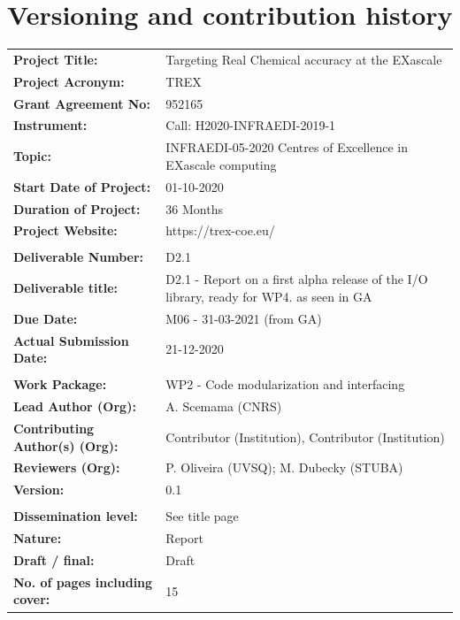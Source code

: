 \pagestyle{empty}

\section*{Versioning and contribution history}

\begin{flushleft}
  \begin{tabular}{ll}
    \textbf{Project Title:}    &   Targeting Real Chemical accuracy at the EXascale \\
    \textbf{Project Acronym:} & TREX \\
    \textbf{Grant Agreement No:} & 952165 \\
    \textbf{Instrument:} & Call: H2020-INFRAEDI-2019-1 \\
    \textbf{Topic:} & INFRAEDI-05-2020 Centres of Excellence in EXascale computing \\
    \textbf{Start Date of Project:} & 01-10-2020 \\
    \textbf{Duration of Project:} & 36 Months \\
    \textbf{Project Website:} & https://trex-coe.eu/ \\
& \\
    \textbf{Deliverable Number:} & D2.1 \\
    \textbf{Deliverable title:} & D2.1 - Report on a first alpha release of the I/O library, ready for WP4. as seen in GA \\
    \textbf{Due Date:} & M06 - 31-03-2021 (from GA) \\
    \textbf{Actual Submission Date:} & 21-12-2020 \\
& \\
    \textbf{Work Package:} & WP2 - Code modularization and interfacing \\
    \textbf{Lead Author (Org):} & A. Scemama (CNRS) \\
    \textbf{Contributing Author(s) (Org):} & Contributor (Institution), Contributor (Institution) \\
    \textbf{Reviewers (Org):} & P. Oliveira (UVSQ); M. Dubecky (STUBA) \\
    \textbf{Version:} & 0.1 \\
& \\
    \textbf{Dissemination level:} & See title page \\
    \textbf{Nature:} & Report \\
    \textbf{Draft / final:} & Draft \\
    \textbf{No. of pages including cover:} & 15 \\
  \end{tabular}



\newcommand\Tstrut{\rule{0pt}{2.6ex}}         %
\newcommand\Bstrut{\rule[-0.9ex]{0pt}{0pt}}   %

\end{flushleft}

